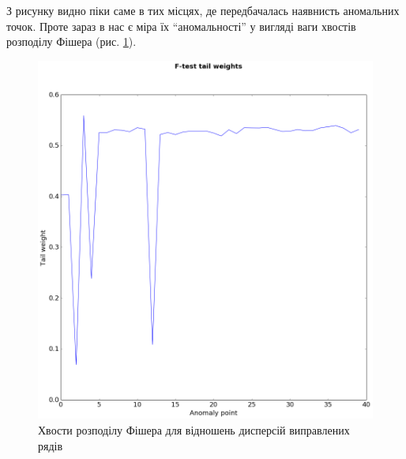 З рисунку видно піки саме в тих місцях,
де передбачалась наявнисть аномальних точок.
Проте зараз в нас є міра їх ``аномальності''
у вигляді ваги хвостів розподілу Фішера (рис. \ref{fig:anomaly:fisher}).
\begin{figure}[h!]
  \centering
  \includegraphics[width=\textwidth]{Coursework_files/Coursework_17_0.png}
  \caption{Хвости розподілу Фішера для відношень дисперсій виправлених рядів}
  \label{fig:anomaly:fisher}
\end{figure}


